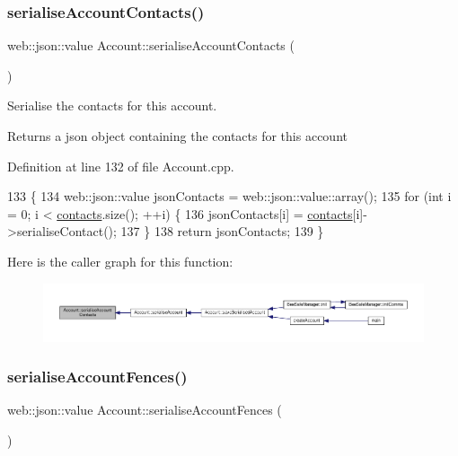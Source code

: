 \subsubsection{\texorpdfstring{serialise\+Account\+Contacts()}{serialiseAccountContacts()}}
{\footnotesize\ttfamily web\+::json\+::value Account\+::serialise\+Account\+Contacts (\begin{DoxyParamCaption}{ }\end{DoxyParamCaption})}

Serialise the contacts for this account.

\begin{DoxyReturn}{Returns}
a json object containing the contacts for this account 
\end{DoxyReturn}


Definition at line 132 of file Account.\+cpp.


\begin{DoxyCode}
133 \{
134     web::json::value jsonContacts = web::json::value::array();
135     \textcolor{keywordflow}{for} (\textcolor{keywordtype}{int} i = 0; i < \hyperlink{class_account_aa4f77abd7c44f2a70b0cff8088e3491f}{contacts}.size(); ++i) \{
136         jsonContacts[i] = \hyperlink{class_account_aa4f77abd7c44f2a70b0cff8088e3491f}{contacts}[i]->serialiseContact();
137     \}
138     \textcolor{keywordflow}{return} jsonContacts;
139 \}
\end{DoxyCode}
Here is the caller graph for this function\+:\nopagebreak
\begin{figure}[H]
\begin{center}
\leavevmode
\includegraphics[width=350pt]{db/d22/class_account_a7f2d9836817ee851f723f6d3b1ff74a5_icgraph}
\end{center}
\end{figure}
\mbox{\label{class_account_a426837a406852a6e6b11eda85828fc58}} 
\subsubsection{\texorpdfstring{serialise\+Account\+Fences()}{serialiseAccountFences()}}
{\footnotesize\ttfamily web\+::json\+::value Account\+::serialise\+Account\+Fences (\begin{DoxyParamCaption}{ }\end{DoxyParamCaption})}

